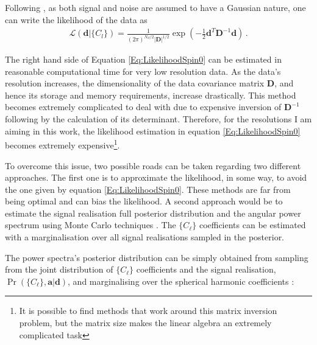 \qquad Following \cite{Borrill1999,Hobson2002,Taylor2008}, as both signal and noise are assumed to have a Gaussian nature, one can write the likelihood of the data as
\begin{align}
\mathcal{L}(\mathbf{d}|\{C_{l}\}) = \frac{1}{(2\pi)^{N_d/2}|\mathbf{D}|^{1/2}}\exp \left(-\frac{1}{2}\mathbf{d}^T\mathbf{D}^{-1}\mathbf{d} \right)\, .
\label{Eq:LikelihoodSpin0}
\end{align}

\qquad The right hand side of Equation \eqref{Eq:LikelihoodSpin0} can be estimated in reasonable computational time for very low resolution data. As the data's resolution increases, the dimensionality of the data covariance matrix $\mathbf{D}$, and hence its storage and memory requirements, increase drastically. This method becomes extremely complicated to deal with due to expensive inversion of $\mathbf{D}^{-1}$ following by the calculation of its determinant. Therefore, for the resolutions I am aiming in this work, the likelihood estimation in equation \eqref{Eq:LikelihoodSpin0} becomes extremely expensive\footnote{It is possible to find methods that work around this matrix inversion problem, but the matrix size makes the linear algebra an extremely complicated task}. 

\qquad To overcome this issue, two possible roads can be taken regarding two different approaches. The first one is to approximate the likelihood, in some way, to avoid the one given by equation \eqref{Eq:LikelihoodSpin0}. These methods are far from being optimal and can bias the likelihood. A second approach would be to estimate the signal realisation full posterior distribution and the angular power spectrum using Monte Carlo techniques \citep{Taylor2008,AlmostBlackPearl2016}. The $\{ C_{\ell}\}$ coefficients can be estimated with a marginalisation over all signal realisations sampled in the posterior. 

\qquad The power spectra's posterior distribution can be simply obtained from sampling from the joint distribution of $\{C_{\ell}\}$ coefficients and the signal realisation, $\Pr(\{C_{\ell}\},\mathbf{a}|\mathbf{d})$, and marginalising over the spherical harmonic coefficients \citep{Eriksen2004,Wandelt2004,Taylor2008,AlmostBlackPearl2016}:

